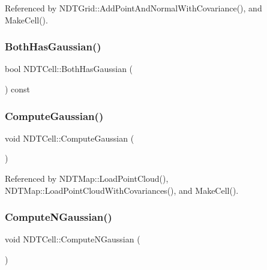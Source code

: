 Referenced by N\+D\+T\+Grid\+::\+Add\+Point\+And\+Normal\+With\+Covariance(), and Make\+Cell().

\mbox{\label{classNDTCell_a7864f7609b376f7c60af9a715081608b}} 
\subsubsection{\texorpdfstring{Both\+Has\+Gaussian()}{BothHasGaussian()}}
{\footnotesize\ttfamily bool N\+D\+T\+Cell\+::\+Both\+Has\+Gaussian (\begin{DoxyParamCaption}{ }\end{DoxyParamCaption}) const\hspace{0.3cm}{\ttfamily [inline]}}

\mbox{\label{classNDTCell_afdc99c3644f62eeffff96f98fe3fdeda}} 
\subsubsection{\texorpdfstring{Compute\+Gaussian()}{ComputeGaussian()}}
{\footnotesize\ttfamily void N\+D\+T\+Cell\+::\+Compute\+Gaussian (\begin{DoxyParamCaption}{ }\end{DoxyParamCaption})}



Referenced by N\+D\+T\+Map\+::\+Load\+Point\+Cloud(), N\+D\+T\+Map\+::\+Load\+Point\+Cloud\+With\+Covariances(), and Make\+Cell().

\mbox{\label{classNDTCell_a3c390e46a748a735f528495d3c14f4a6}} 
\subsubsection{\texorpdfstring{Compute\+N\+Gaussian()}{ComputeNGaussian()}}
{\footnotesize\ttfamily void N\+D\+T\+Cell\+::\+Compute\+N\+Gaussian (\begin{DoxyParamCaption}{ }\end{DoxyParamCaption})}


